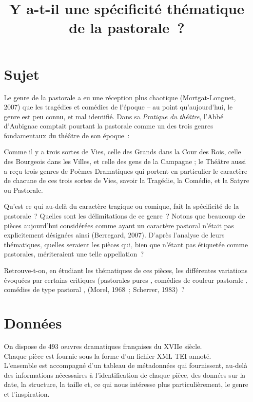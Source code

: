 \documentclass[a4paper,twoside,12pt]{article}
\title{Y a-t-il une spécificité thématique de la pastorale\ ?}
\author{}
\date{}
\begin{document}
\maketitle

\section*{Sujet}
Le genre de la pastorale a eu une réception plus chaotique (Mortgat-Longuet, 2007) que les tragédies et comédies de l’époque – au point qu’aujourd’hui, le genre est peu connu, et mal identifié. Dans sa \textit{Pratique du théâtre}, l’Abbé d’Aubignac comptait pourtant la pastorale comme un des trois genres fondamentaux du théâtre de son époque\ :

\begin{displayquote}
Comme il y a trois sortes de Vies, celle des Grands dans la Cour des Rois, celle des Bourgeois dans les Villes, et celle des gens de la Campagne ; le Théâtre aussi a reçu trois genres de Poèmes Dramatiques qui portent en particulier le caractère de chacune de ces trois sortes de Vies, savoir la Tragédie, la Comédie, et la Satyre ou Pastorale.
\end{displayquote}

Qu’est ce qui au-delà du caractère tragique ou comique, fait la spécificité de la pastorale\ ? Quelles sont les délimitations de ce genre\ ? Notons que beaucoup de pièces aujourd’hui considérées comme ayant un caractère pastoral n’était pas explicitement désignées ainsi (Berregard, 2007). D’après l’analyse de leurs thématiques, quelles seraient les pièces qui, bien que n’étant pas étiquetée comme pastorales, mériteraient une telle appellation\ ?

Retrouve-t-on, en étudiant les thématiques de ces pièces, les différentes variations évoquées par certains critiques (\og pastorales pures \fg{}, \og comédies de couleur pastorale \fg{}, \og comédies de type pastoral \fg{}, (Morel, 1968\ ; Scherrer, 1983)\ ?

\section*{Données}
On dispose de 493 œuvres dramatiques françaises du XVIIe siècle.\\
Chaque pièce est fournie sous la forme d'un fichier XML-TEI annoté.\\
L'ensemble est accompagné d'un tableau de métadonnées qui fournissent, au-delà des informations nécessaires à l'identification de chaque pièce, des données sur la date, la structure, la taille et, ce qui nous intéresse plus particulièrement, le genre et l'inspiration.
\end{document}
